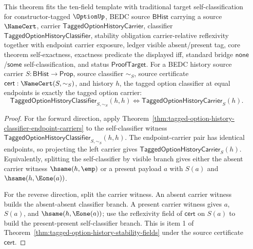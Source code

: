 \begin{theorem}
\label{thm:tagged-option-history-classifier-self-exactness}
This theorem fits the ten-field template with traditional target self-classification for constructor-tagged $\OptionUp$, BEDC source $\mathsf{BHist}$ carrying a source $\NameCert$, carrier $\mathsf{TaggedOptionHistoryCarrier}$, classifier $\mathsf{TaggedOptionHistoryClassifier}$, stability obligation carrier-relative reflexivity together with endpoint carrier exposure, ledger visible absent/present tag, core theorem self-exactness, exactness predicate the displayed iff, standard bridge $\mathsf{none}$/$\mathsf{some}$ self-classification, and status $\mathsf{ProofTarget}$.
For a BEDC history source carrier $S:\mathsf{BHist}\to\mathsf{Prop}$, source
classifier $\sim_S$, source certificate $\mathsf{cert}:\NameCert(S,\sim_S)$,
and history $h$, the tagged option classifier at equal endpoints is exactly
the tagged option carrier:
$$
\mathsf{TaggedOptionHistoryClassifier}_{S,\sim_S}(h,h)
\Longleftrightarrow
\mathsf{TaggedOptionHistoryCarrier}_S(h).
$$
\end{theorem}
\begin{proof}
For the forward direction, apply
Theorem~\ref{thm:tagged-option-history-classifier-endpoint-carriers} to the
self-classifier witness
$\mathsf{TaggedOptionHistoryClassifier}_{S,\sim_S}(h,h)$. The endpoint-carrier
pair has identical endpoints, so projecting the left carrier gives
$\mathsf{TaggedOptionHistoryCarrier}_S(h)$. Equivalently, splitting the
self-classifier by visible branch gives either the absent carrier witness
$\hsame(h,\emp)$ or a present payload $a$ with $S(a)$ and
$\hsame(h,\Eone(a))$.

For the reverse direction, split the carrier witness. An absent carrier witness
builds the absent-absent classifier branch. A present carrier witness gives
$a$, $S(a)$, and $\hsame(h,\Eone(a))$; use the reflexivity field of
$\mathsf{cert}$ on $S(a)$ to build the present-present self-classifier branch.
This is item 1 of
Theorem~\ref{thm:tagged-option-history-stability-fields} under the source
certificate $\mathsf{cert}$.
\end{proof}

